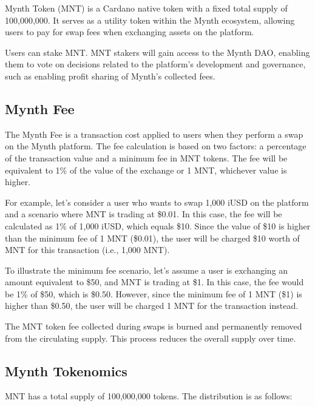 Mynth Token (MNT) is a Cardano native token with a fixed total supply of
100,000,000. It serves as a utility token within the Mynth ecosystem,
allowing users to pay for swap fees when exchanging assets on the
platform.

Users can stake MNT. MNT stakers will gain access to the Mynth DAO,
enabling them to vote on decisions related to the platform's development
and governance, such as enabling profit sharing of Mynth's collected
fees.

\hypertarget{mynth-fee}{%
\subsection{Mynth Fee}\label{mynth-fee}}

The Mynth Fee is a transaction cost applied to users when they perform a
swap on the Mynth platform. The fee calculation is based on two factors:
a percentage of the transaction value and a minimum fee in MNT tokens.
The fee will be equivalent to 1\% of the value of the exchange or 1 MNT,
whichever value is higher.

For example, let's consider a user who wants to swap 1,000 iUSD on the
platform and a scenario where MNT is trading at \$0.01. In this case,
the fee will be calculated as 1\% of 1,000 iUSD, which equals \$10.
Since the value of \$10 is higher than the minimum fee of 1 MNT
(\$0.01), the user will be charged \$10 worth of MNT for this
transaction (i.e., 1,000 MNT).

To illustrate the minimum fee scenario, let's assume a user is
exchanging an amount equivalent to \$50, and MNT is trading at \$1. In
this case, the fee would be 1\% of \$50, which is \$0.50. However, since
the minimum fee of 1 MNT (\$1) is higher than \$0.50, the user will be
charged 1 MNT for the transaction instead.

The MNT token fee collected during swaps is burned and permanently
removed from the circulating supply. This process reduces the overall
supply over time.

\hypertarget{mynth-tokenomics}{%
\subsection{Mynth Tokenomics}\label{mynth-tokenomics}}

MNT has a total supply of 100,000,000 tokens. The distribution is as
follows:

